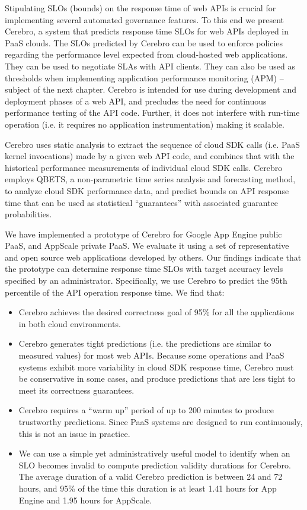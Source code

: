 Stipulating SLOs (bounds) on the response time of web APIs is crucial for 
implementing several automated governance features. To this end we present
Cerebro, a system that predicts response time SLOs for web APIs deployed 
in PaaS clouds. The SLOs predicted by Cerebro can be used to
enforce policies regarding the performance level expected from cloud-hosted
web applications. They can be used to negotiate SLAs with API clients.
They can also be used as
thresholds when implementing application performance monitoring (APM) --
subject of the next chapter.
Cerebro is intended for use during development and 
deployment phases of a web API, and 
precludes the need for continuous performance testing of the API code. 
Further, it does not interfere with run-time operation (i.e. it requires
no application instrumentation) making it scalable.

Cerebro uses static analysis to extract the sequence of cloud SDK 
calls (i.e. PaaS kernel invocations) made by a given web API code, 
and combines that with the
historical performance measurements of individual cloud SDK calls. 
Cerebro employs QBETS, a non-parametric time series analysis and 
forecasting method, to analyze cloud SDK performance data, and predict bounds
on API response time that can be used as statistical ``guarantees'' with
associated guarantee probabilities.

We have implemented a prototype of Cerebro for Google App Engine public PaaS,
and AppScale private PaaS. We evaluate it using a set of representative
and open source web applications developed by others.  
Our findings indicate that the prototype can determine response time SLOs
with target accuracy levels specified by an administrator. 
Specifically, we use Cerebro to predict the 95th percentile of the API operation response time. 
We find that:
\begin{itemize}
\item Cerebro achieves the desired correctness goal of 95\% for all the applications in both cloud environments.
\item Cerebro generates tight predictions (i.e.
the predictions are similar to measured values) for most web APIs.  Because
some operations and PaaS systems exhibit more variability in cloud SDK response
time, 
Cerebro must be conservative in some cases, and produce predictions that are less tight
to meet its correctness guarantees.  
\item Cerebro requires a ``warm up'' period of up to 200 minutes to produce trustworthy 
predictions. Since PaaS systems are designed to run continuously, this is not an issue in practice. 
\item We can use a simple yet administratively useful model to identify when an 
SLO becomes invalid to compute
prediction validity durations for Cerebro.  The average duration of a valid
Cerebro prediction is between 24 and 72 hours,
and 95\% of the time this duration is at least 
1.41 hours for App Engine and 1.95 hours for AppScale.
\end{itemize} 

